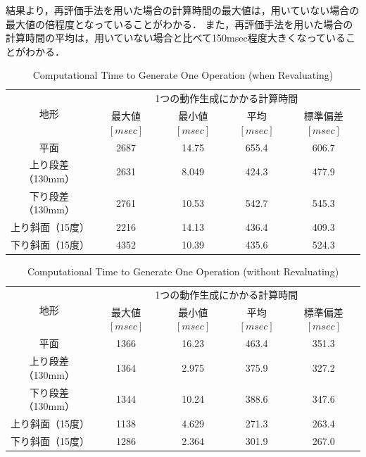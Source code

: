 結果より，再評価手法を用いた場合の計算時間の最大値は，用いていない場合の最大値の倍程度となっていることがわかる．
また，再評価手法を用いた場合の計算時間の平均は，用いていない場合と比べて150msec程度大きくなっていることがわかる．

\begin{table}[htbp]
  \caption{Computational Time to Generate One Operation (when Revaluating)}
  \label{tab:ch5_calc_time_revaluation}  %
  \centering
  \begin{tabular}{|c||c|c|c|c|} \hline  %
    \multirow{2}{*}{地形} & \multicolumn{4}{c|}{1つの動作生成にかかる計算時間} \\ \cline{2-5}  %
     & 最大値 $[msec]$ & 最小値 $[msec]$ & 平均 $[msec]$ & 標準偏差 $[msec]$ \\ \hline \hline  %
    平面 & 2687 & 14.75 & 655.4 & 606.7 \\ \hline  %
    上り段差（130mm）& 2631 & 8.049 & 424.3 & 477.9 \\ \hline  %
    下り段差（130mm）& 2761 & 10.53 & 542.7 & 545.3 \\ \hline  %
    上り斜面（15度） & 2216 & 14.13 & 436.4 & 409.3 \\ \hline  %
    下り斜面（15度） & 4352 & 10.39 & 435.6 & 524.3 \\ \hline  %
  \end{tabular}
\end{table}

\begin{table}[htbp]
  \caption{Computational Time to Generate One Operation (without Revaluating)}
  \label{tab:ch5_calc_time_140mm}  %
  \centering
  \begin{tabular}{|c||c|c|c|c|} \hline  %
    \multirow{2}{*}{地形} & \multicolumn{4}{c|}{1つの動作生成にかかる計算時間} \\ \cline{2-5}  %
     & 最大値 $[msec]$ & 最小値 $[msec]$ & 平均 $[msec]$ & 標準偏差 $[msec]$ \\ \hline \hline  %
    平面 & 1366 & 16.23 & 463.4 & 351.3 \\ \hline %
    上り段差（130mm）& 1364 & 2.975 & 375.9 & 327.2 \\ \hline %
    下り段差（130mm）& 1344 & 10.24 & 388.6 & 347.6 \\ \hline %
    上り斜面（15度） & 1138 & 4.629 & 271.3 & 263.4 \\ \hline %
    下り斜面（15度） & 1286 & 2.364 & 301.9 & 267.0 \\ \hline %
  \end{tabular}
\end{table}

